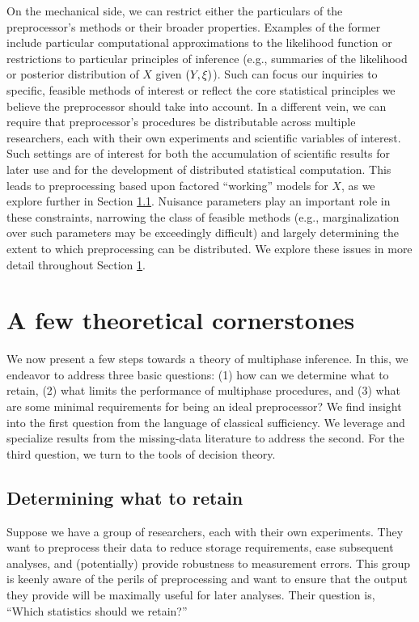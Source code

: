 On the mechanical side, we can restrict either the particulars of the preprocessor's methods or their broader properties.
Examples of the former include particular computational approximations to the likelihood function or restrictions to particular principles of inference (e.g., summaries of the likelihood or posterior distribution of $X$ given $(Y, \xi)$).
Such can focus our inquiries to specific, feasible methods of interest or reflect the core statistical principles we believe the preprocessor should take into account.
In a different vein, we can require that preprocessor's procedures be distributable across multiple researchers, each with their own experiments and scientific variables of interest.
Such settings are of interest for both the accumulation of scientific results for later use and for the development of distributed statistical computation.
This leads to preprocessing based upon factored ``working'' models for $X$, as we explore further in Section \ref{multiphase:sec:sufficiency}.
Nuisance parameters play an important role in these constraints, narrowing the class of feasible methods (e.g., marginalization over such parameters may be exceedingly difficult) and largely determining the extent to which preprocessing can be distributed.
We explore these issues in more detail throughout Section \ref{multiphase:sec:theory}.

\section{A few theoretical cornerstones}
\label{multiphase:sec:theory}

We now present a few steps towards a theory of multiphase inference.
In this, we endeavor to address three basic questions: (1) how can we determine what to retain, (2) what limits the performance of multiphase procedures, and (3) what are some minimal requirements for being an ideal preprocessor?
We find insight into the first question from the language of classical sufficiency.
We leverage and specialize results from the missing-data literature  to address the second.
For the third question, we turn to the tools of decision theory.

\subsection{Determining what to retain}
\label{multiphase:sec:sufficiency}

Suppose we have a group of researchers, each with their own experiments.
They want to preprocess their data to reduce storage requirements, ease subsequent analyses, and (potentially) provide robustness to measurement errors.
This group is keenly aware of the perils of preprocessing and want to ensure that the output they provide will be maximally useful for later analyses.
Their question is, ``Which statistics should we retain?''

